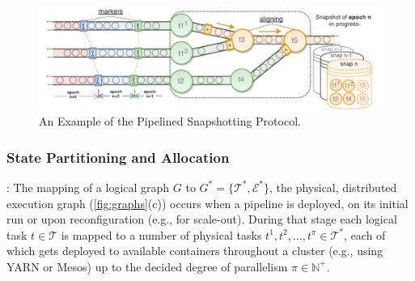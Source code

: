 



\begin{figure}[t]
\centering
\includegraphics[width=\textwidth]{figures/snapshots-overview.pdf}
\vspace*{-10mm}
\caption{An Example of the Pipelined Snapshotting Protocol.} 
\label{fig:snapshots-overview}
\vspace{-4mm}
\end{figure}


\subsubsection{State Partitioning and Allocation}

: The mapping of a logical graph $G$ to $G^* = \{\mathcal{T^*}, \mathcal{E^*}\}$, the physical, distributed execution graph (\autoref{fig:graphs}(c)) occurs when a pipeline is deployed, on its initial run or upon reconfiguration (e.g., for scale-out). During that stage each logical task $t \in \mathcal{T}$ is mapped to a number of physical tasks $t^1, t^2, \ldots, t^\pi \in \mathcal{T^*}$, each of which gets deployed to available containers throughout a cluster (e.g., using YARN \cite{vavilapalli2013apache} or Mesos) up to the decided degree of parallelism $\pi \in \mathbb{N^+}$. 

